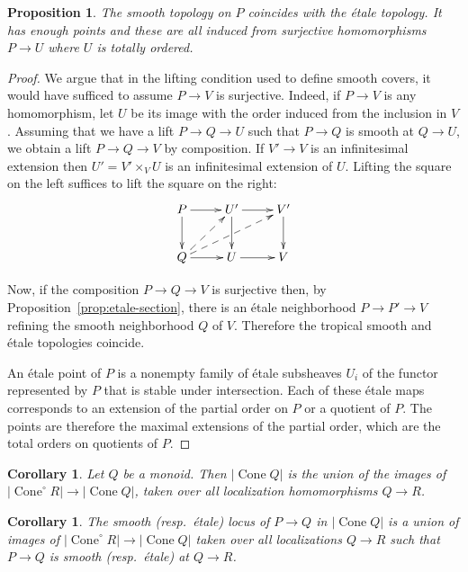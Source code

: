 \documentclass[12pt]{amsart}
\newtheorem{proposition}[theorem]{Proposition}
\newtheorem{corollary}[theorem]{Corollary}
\theoremstyle{definition}
\theoremstyle{remark}
\def\Cone{\operatorname{Cone}}
\begin{document}
\begin{proposition} \label{prop:points}
The smooth topology on $P$ coincides with the \'etale topology.  It has enough points and these are all induced from surjective homomorphisms $P \to U$ where $U$ is totally ordered.
\end{proposition}
\begin{proof}
We argue that in the lifting condition used to define smooth covers, it would have sufficed to assume $P \to V$ is surjective.  Indeed, if $P \to V$ is any homomorphism, let $U$ be its image with the order induced from the inclusion in $V$.  Assuming that we have a lift $P \to Q \to U$ such that $P \to Q$ is smooth at $Q \to U$, we obtain a lift $P \to Q \to V$ by composition.  If $V' \to V$ is an infinitesimal extension then $U' = V' \mathop\times_V U$ is an infinitesimal extension of $U$.  Lifting the square on the left suffices to lift the square on the right:
\begin{equation} \label{eqn:4} \vcenter{ \xymatrix{
P \ar[r] \ar[d] & U' \ar[r] \ar[d] & V' \ar[d] \\
Q \ar[r] \ar@{-->}[ur] \ar@{-->}[urr] & U \ar[r] & V
} } \end{equation}

Now, if the composition $P \to Q \to V$ is surjective then, by Proposition~\ref{prop:etale-section}, there is an \'etale neighborhood $P \to P' \to V$ refining the smooth neighborhood $Q$ of $V$.  Therefore the tropical smooth and \'etale topologies coincide.

An \'etale point of $P$ is a nonempty family of \'etale subsheaves $U_i$ of the functor represented by $P$ that is stable under intersection.  Each of these \'etale maps corresponds to an extension of the partial order on $P$ or a quotient of $P$.  The points are therefore the maximal extensions of the partial order, which are the total orders on quotients of $P$.
\end{proof}

\begin{corollary}
Let $Q$ be a monoid.  Then $|\Cone Q|$ is the union of the images of $|\Cone^\circ R| \to |\Cone Q|$, taken over all localization homomorphisms $Q \to R$.
\end{corollary}

\begin{corollary}
The smooth (resp.\ \'etale) locus of $P \to Q$ in $|\Cone Q|$ is a union of images of $|\Cone^\circ R| \to |\Cone Q|$ taken over all localizations $Q \to R$ such that $P \to Q$ is smooth (resp.\ \'etale) at $Q \to R$.
\end{corollary}
\end{document}
